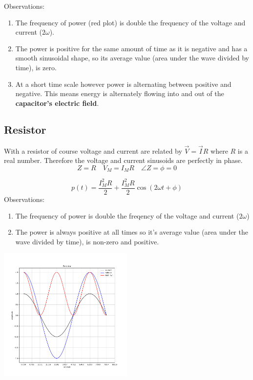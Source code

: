 Observations:
\begin{enumerate}
    \item The frequency of power (red plot) is double the frequency of the voltage and current ($2\omega$).
    \item The power is   positive for the same amount of time as it is
    negative and has a smooth sinusoidal shape, so its average value
    (area under the wave divided by time), is zero.
    \item At a short time scale however power is alternating between
    positive and negative.  This means energy is alternately flowing
    into and out of the {\bf capacitor's electric field}.
\end{enumerate}

\subsection*{Resistor}

With a resistor of course voltage and current are related by
  $\vec V = \vec I R$ where $R$ is a real number.  Therefore the voltage and current sinusoids are perfectly in phase.
\[
Z = R \quad V_M = I_M R \quad \angle Z = \phi = 0
\]

\[
p(t) = \frac{I_M^2 R}{2} + \frac{I_M^2 R}{2} \cos(2\omega t + \phi)
\]
Observations:
\begin{enumerate}
    \item The frequency of power is double the freqency of the voltage and
    current ($2\omega$)
    \item The power is always positive at all times so it's average value
    (area under the wave divided by time), is non-zero and positive.
\end{enumerate}

\includegraphics[width=0.5\textwidth]{figsChapt03/QI00215.png}


